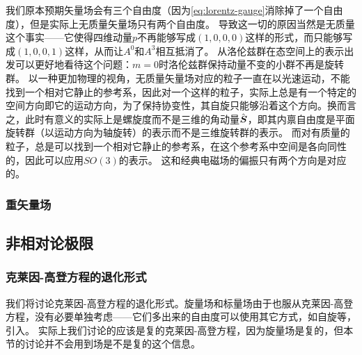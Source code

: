\documentclass[hyperref, UTF8, a4paper]{ctexart}
\begin{document}
我们原本预期矢量场会有三个自由度（因为\eqref{eq:lorentz-gauge}消除掉了一个自由度），但是实际上无质量矢量场只有两个自由度。
导致这一切的原因当然是无质量这个事实——它使得四维动量$p$不再能够写成$(1, 0, 0, 0)$这样的形式，而只能够写成$(1,0,0,1)$这样，从而让$A^0$和$A^3$相互抵消了。
从洛伦兹群在态空间上的表示出发可以更好地看待这个问题：$m=0$时洛伦兹群保持动量不变的小群不再是旋转群。
以一种更加物理的视角，无质量矢量场对应的粒子一直在以光速运动，不能找到一个相对它静止的参考系，因此对一个这样的粒子，实际上总是有一个特定的空间方向即它的运动方向，为了保持协变性，其自旋只能够沿着这个方向。换而言之，此时有意义的实际上是螺旋度而不是三维的角动量$\hat{\vb*{S}}$，即其内禀自由度是平面旋转群（以运动方向为轴旋转）的表示而不是三维旋转群的表示。
而对有质量的粒子，总是可以找到一个相对它静止的参考系，在这个参考系中空间是各向同性的，因此可以应用$SO(3)$的表示。
这和经典电磁场的偏振只有两个方向是对应的。



\subsubsection{重矢量场}

\subsection{非相对论极限}

\subsubsection{克莱因-高登方程的退化形式}

我们将讨论克莱因-高登方程的退化形式。旋量场和标量场由于也服从克莱因-高登方程，没有必要单独考虑——它们多出来的自由度可以使用其它方式，如自旋等，引入。
实际上我们讨论的应该是复的克莱因-高登方程，因为旋量场是复的，但本节的讨论并不会用到场是不是复的这个信息。
\end{document}
